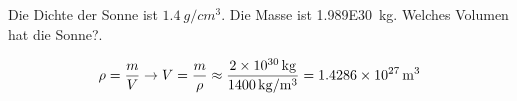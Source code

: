 
\begin{aufgabe}
Die Dichte der Sonne ist $\SI{1.4}{g/cm^3}$. Die Masse ist \SI{1.989E30}{kg}. Welches Volumen hat die Sonne?.

\begin{loesung}
\[\rho=\frac{m}{V} \to V=\frac{m}{\rho} \approx \frac{\SI{2E30}{kg}}{\SI{1400}{kg/m^3}}=\SI{1.4286e+27}{m^3}\]
\end{loesung}
\end{aufgabe}
